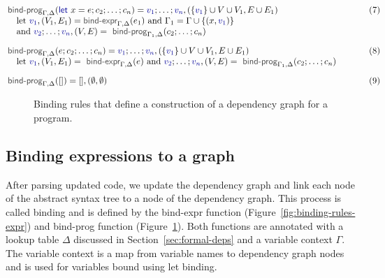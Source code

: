 \documentclass[acmsmall,anonymous,fleqn]{acmart}\settopmatter{printfolios=false,printccs=false,printacmref=false}
\theoremstyle{plain}
\theoremstyle{definition}
\newcommand{\ident}[1]{\textnormal{\textcolor{idclr}{\sffamily #1}}}
\newcommand{\kvd}[1]{\textnormal{\textcolor{kvdclr}{\sffamily #1}}}
\newcommand{\bndclr}[1]{\textcolor{kvdclr}{#1}}
\begin{document}

\begin{figure}[t]
\begin{equation*}
\hspace{-3.5em}
\begin{array}{ll}
\ident{bind-prog}_{\Gamma, \Delta}(\kvd{let}~x=e; c_2; \ldots; c_n) = \bndclr{v_1};\ldots;\bndclr{v_n}, (\{\bndclr{v_1}\} \cup V \cup V_1, E \cup E_1)
  \hspace{9.35em}&(7)\\
\quad \textnormal{let}~\bndclr{v_1}, (V_1,E_1) = \ident{bind-expr}_{\Gamma,\Delta}(e_1)~\textnormal{and}~\Gamma_1 = \Gamma \cup \{(x,\bndclr{v_1})\} \\
\quad \textnormal{and}~\bndclr{v_2}; \ldots; \bndclr{v_n}, (V, E) = \ident{bind-prog}_{\Gamma_1, \Delta}(c_2; \ldots; c_n)
\\[1em]
\ident{bind-prog}_{\Gamma, \Delta}(e; c_2; \ldots; c_n) = \bndclr{v_1};\ldots;\bndclr{v_n}, (\{\bndclr{v_1}\} \cup V \cup V_1, E \cup E_1)&(8)\\
\quad \textnormal{let}~\bndclr{v_1}, (V_1,E_1) = \ident{bind-expr}_{\Gamma,\Delta}(e)
~\textnormal{and}~\bndclr{v_2}; \ldots; \bndclr{v_n}, (V, E) = \ident{bind-prog}_{\Gamma_1, \Delta}(c_2; \ldots; c_n)
\\[1em]
\ident{bind-prog}_{\Gamma, \Delta}([]) = [], (\emptyset, \emptyset)&(9)
\end{array}
\end{equation*}
\caption{Binding rules that define a construction of a dependency graph for a program.}
\label{fig:binding-rules-prog}
\end{figure}



\subsection{Binding expressions to a graph}
\label{sec:formal-bind}

After parsing updated code, we update the dependency graph and link each node of the abstract
syntax tree to a node of the dependency graph. This process is called
binding and is defined by the \ident{bind-expr} function (Figure~\ref{fig:binding-rules-expr})
and \ident{bind-prog} function (Figure~\ref{fig:binding-rules-prog}). Both functions are
annotated with a lookup table $\Delta$ discussed in Section~\ref{sec:formal-deps} and a variable
context $\Gamma$. The variable context is a map from variable names to dependency graph nodes and
is used for variables bound using \kvd{let} binding.
\end{document}
